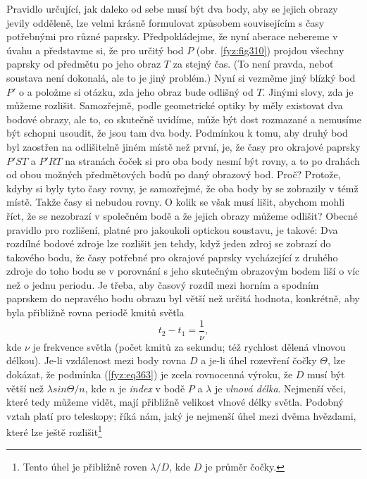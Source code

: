     Pravidlo určující, jak daleko od sebe musí být dva body, aby se jejich obrazy jevily odděleně, 
    lze velmi krásně formulovat způsobem souvisejícím s časy potřebnými pro různé paprsky. 
    Předpokládejme, že nyní aberace nebereme v úvahu a představme si, že pro určitý bod \(P\) (obr. 
    \ref{fyz:fig310}) projdou všechny paprsky od předmětu po jeho obraz \(T\) za stejný čas. (To 
    není pravda, neboť soustava není dokonalá, ale to je jiný problém.) Nyní si vezměme jiný blízký 
    bod \(P'\) o a položme si otázku, zda jeho obraz bude odlišný od \(T\). Jinými slovy, zda je 
    můžeme rozlišit. Samozřejmě, podle geometrické optiky by měly existovat dva bodové obrazy, ale 
    to, co skutečně uvidíme, může být dost rozmazané a nemusíme být schopni usoudit, že jsou tam 
    dva body. Podmínkou k tomu, aby druhý bod byl zaostřen na odlišitelně jiném místě než první, 
    je, že časy pro okrajové paprsky \(P'ST\) a \(P'RT\) na stranách čoček si pro oba body nesmí 
    být rovny, a to po drahách od obou možných předmětových bodů po daný obrazový bod. Proč? 
    Protože, kdyby si byly tyto časy rovny, je samozřejmé, že oba body by se zobrazily v témž 
    místě. Takže časy si nebudou rovny. O kolik se však musí lišit, abychom mohli říct, že se 
    nezobrazí v společném bodě a že jejich obrazy můžeme odlišit? Obecné pravidlo pro rozlišení, 
    platné pro jakoukoli optickou soustavu, je takové: Dva rozdílné bodové zdroje lze rozlišit jen 
    tehdy, když jeden zdroj se zobrazí do takového bodu, že časy potřebné pro okrajové paprsky 
    vycházející z druhého zdroje do toho bodu se v porovnání s jeho skutečným obrazovým bodem liší 
    o víc než o jednu periodu. Je třeba, aby časový rozdíl mezi horním a spodním paprskem do 
    nepravého bodu obrazu byl větší než určitá hodnota, konkrétně, aby byla přibližně rovna periodě 
    kmitů světla
    \begin{equation}\label{fyz:eq363}
       t_2 - t_1 = \frac{1}{\nu},
    \end{equation}    
    kde \(\nu\) je frekvence světla (počet kmitů za sekundu; též rychlost dělená vlnovou délkou). 
    Je-li vzdálenost mezi body rovna \(D\) a je-li úhel rozevření čočky \(\varTheta\), lze dokázat, 
    že podmínka (\ref{fyz:eq363}) je zcela rovnocenná výroku, že \(D\) musí být větší než \(\lambda 
    sin\varTheta/n\), kde \(n\) je \emph{index} v bodě \(P\) a \(\lambda\) je \emph{vlnová délka}. 
    Nejmenší věci, které tedy můžeme vidět, mají přibližně velikost vlnové délky světla. Podobný 
    vztah platí pro teleskopy; říká nám, jaký je nejmenší úhel mezi dvěma hvězdami, které lze ještě 
    rozlišit\footnote{Tento úhel je přibližně roven \(\lambda/D\), kde \(D\) je průměr čočky.}
    
